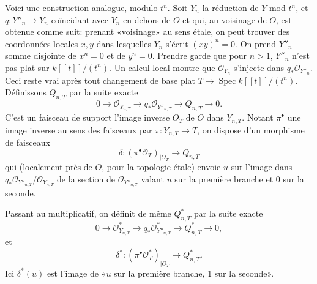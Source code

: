 \documentclass[11pt]{article}
\DeclareMathOperator{\Spec}{Spec}
\newcommand{\OO}{\mathcal O}
\begin{document}
Voici une construction analogue, modulo $t^n$. Soit $Y_n$ la réduction de $Y$ mod $t^n$, et $q:Y''_n\to Y_n$ coïncidant avec $Y_n$ en dehors de $O$ et qui, au voisinage de $O$, est obtenue comme suit: prenant «voisinage» au sens étale, on peut trouver des coordonnées locales $x,y$ dans lesquelles $Y_n$ s'écrit $(xy)^n=0$. On prend $Y''_n$ somme disjointe de $x^n=0$ et de $y^n=0$. Prendre garde que pour $n>1$, $Y''_n$ n'est pas plat sur $k[[t]]/(t^n)$. Un calcul local montre que $\OO_{Y_n}$ s'injecte dans $q_*\OO_{Y''_n}$. Ceci reste vrai après tout changement de base plat $T\to\Spec k[[t]]/(t^n)$. Définissons $Q_{n,T}$ par la suite exacte
\begin{equation}
        0\longrightarrow\OO_{Y_{n,T}}\longrightarrow q_*\OO_{Y''_{n,T}}\longrightarrow Q_{n,T}\longrightarrow0. \tag{2.4.2}
\end{equation}
C'est un faisceau de support l'image inverse $O_T$ de $O$ dans $Y_{n,T}$. Notant $\pi^\bullet$ une image inverse au sens des faisceaux par $\pi:Y_{n,T}\to T$, on dispose d'un morphisme de faisceaux
\begin{equation}
        \delta:(\pi^\bullet\OO_T)_{|O_T}\longrightarrow Q_{n,T} \tag{2.4.3}
\end{equation}
qui (localement près de $O$, pour la topologie étale) envoie $u$ sur l'image dans $q_*\OO_{Y''_{n,T}}/\OO_{Y_{n,T}}$ de la section de $\OO_{Y''_{n,T}}$ valant $u$ sur la première branche et 0 sur la seconde.

Passant au multiplicatif, on définit de même $Q^*_{n,T}$ par la suite exacte
\begin{equation}
        0\longrightarrow\OO^*_{Y_{n,T}}\longrightarrow q_*\OO^*_{Y''_{n,T}}\longrightarrow Q^*_{n,T}\longrightarrow0, \tag{2.4.4}
\end{equation}
et
\begin{equation}
        \delta^*:(\pi^\bullet\OO^*_T)_{|O_T}\longrightarrow Q^*_{n,T}. \tag{2.4.5}
\end{equation}
Ici $\delta^*(u)$ est l'image de «$u$ sur la première branche, 1 sur la seconde».
\end{document}
